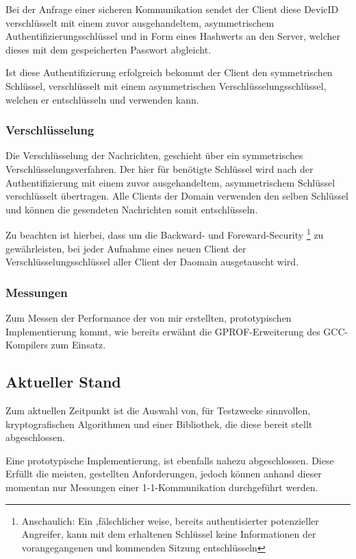 Bei der Anfrage einer sicheren Kommunikation sendet der Client diese DevicID verschlüsselt mit einem zuvor ausgehandeltem, asymmetrischem Authentifizierungsschlüssel und in Form eines Hashwerts an den Server, welcher dieses mit dem gespeicherten Passwort abgleicht.

Ist diese Authentifizierung erfolgreich bekommt der Client den symmetrischen Schlüssel, verschlüsselt mit einem asymmetrischen Verschlüsselungsschlüssel, welchen er entschlüsseln und verwenden kann. 

\subsubsection{Verschlüsselung}
Die Verschlüsselung der Nachrichten, geschieht über ein symmetrisches Verschlüsselungsverfahren. Der hier für benötigte Schlüssel wird nach der Authentifizierung mit einem zuvor ausgehandeltem, asymmetrischem Schlüssel verschlüsselt übertragen. Alle Clients der Domain verwenden den selben Schlüssel und können die gesendeten Nachrichten somit entschlüsseln. 

Zu beachten ist hierbei, dass um die Backward- und Foreward-Security \footnote{Anschaulich: Ein ,fälschlicher weise, bereits authentisierter potenzieller Angreifer, kann mit dem erhaltenen Schlüssel keine Informationen der vorangegangenen und kommenden Sitzung entschlüsseln} zu gewährleisten, bei jeder Aufnahme eines neuen Client der Verschlüsselungsschlüssel aller Client der Daomain ausgetauscht wird. 

\subsubsection{Messungen}
Zum Messen der Performance der von mir erstellten, prototypischen Implementierung kommt, wie bereits erwähnt die GPROF-Erweiterung des GCC-Kompilers zum Einsatz. 

\subsection{Aktueller Stand} 
Zum aktuellen Zeitpunkt ist die Auswahl von, für Testzwecke sinnvollen, kryptografischen Algorithmen und einer Bibliothek, die diese bereit stellt abgeschlossen. 

Eine prototypische Implementierung, ist ebenfalls nahezu abgeschlossen. Diese Erfüllt die meisten, gestellten Anforderungen, jedoch können anhand dieser momentan nur Messungen einer 1-1-Kommunikation durchgeführt werden. 

